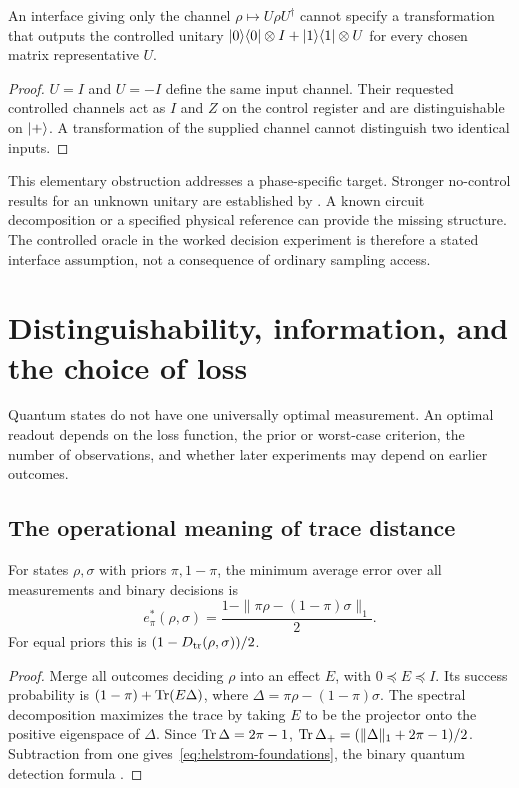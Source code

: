 \begin{lemma}
An interface giving only the channel $\rho\mapsto U\rho U^\dagger$
cannot specify a transformation that outputs the controlled unitary
$\lvert 0\rangle\langle 0\rvert\otimes I+\lvert 1\rangle\langle 1\rvert\otimes U$ for every chosen matrix
representative $U$.
\end{lemma}
\begin{proof}
$U=I$ and $U=-I$ define the same input channel. Their requested
controlled channels act as $I$ and $Z$ on the control register and
are distinguishable on $\lvert +\rangle$. A transformation of the supplied
channel cannot distinguish two identical inputs.
\end{proof}

This elementary obstruction addresses a phase-specific target. Stronger
no-control results for an unknown unitary are established by
\citet{araujo2014}. A known circuit decomposition or a specified physical
reference can provide the missing structure. The controlled oracle in
the worked decision experiment is therefore a stated interface
assumption, not a consequence of ordinary sampling access.

\section{Distinguishability, information, and the choice of loss}
\label{sec:statistical-foundations}
Quantum states do not have one universally optimal measurement. An
optimal readout depends on the loss function, the prior or worst-case
criterion, the number of observations, and whether later experiments may
depend on earlier outcomes.

\subsection{The operational meaning of trace distance}
\begin{theorem}\label{thm:helstrom-foundations}
For states $\rho,\sigma$ with priors $\pi,1-\pi$, the minimum average
error over all measurements and binary decisions is
\begin{equation}\label{eq:helstrom-foundations}
 e_\pi^*(\rho,\sigma)=
 \frac{1-\|\pi\rho-(1-\pi)\sigma\|_1}{2}.
\end{equation}
For equal priors this is $(1-D_{\rm tr}(\rho,\sigma))/2$.
\end{theorem}
\begin{proof}
Merge all outcomes deciding $\rho$ into an effect $E$, with
$0\preceq E\preceq I$. Its success probability is
$(1-\pi)+\operatorname{Tr}(E\Delta)$, where
$\Delta=\pi\rho-(1-\pi)\sigma$.
The spectral decomposition maximizes the trace by taking $E$ to be
the projector onto the positive eigenspace of $\Delta$.
Since $\operatorname{Tr}\Delta=2\pi-1$,
$\operatorname{Tr}\Delta_+=(\|\Delta\|_1+2\pi-1)/2$. Subtraction from one
gives~\eqref{eq:helstrom-foundations}, the binary quantum detection
formula \citep{helstrom1969}.
\end{proof}


